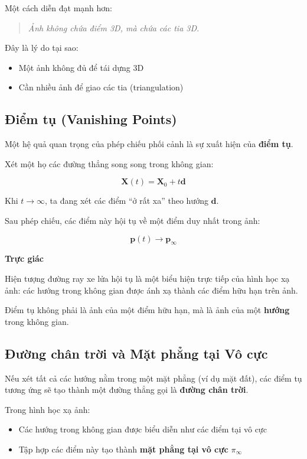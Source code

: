 Một cách diễn đạt mạnh hơn:

\begin{quote}
	\textit{Ảnh không chứa điểm 3D, mà chứa các tia 3D.}
\end{quote}

Đây là lý do tại sao:
\begin{itemize}
	\item Một ảnh không đủ để tái dựng 3D
	\item Cần nhiều ảnh để giao các tia (triangulation)
\end{itemize}

\subsection{Điểm tụ (Vanishing Points)}
\label{subsec:vanishing_points}

Một hệ quả quan trọng của phép chiếu phối cảnh là sự xuất hiện của \textbf{điểm tụ}.

Xét một họ các đường thẳng song song trong không gian:

\[
\mathbf{X}(t) = \mathbf{X}_0 + t \mathbf{d}
\]

Khi $t \rightarrow \infty$, ta đang xét các điểm “ở rất xa” theo hướng $\mathbf{d}$.

Sau phép chiếu, các điểm này hội tụ về một điểm duy nhất trong ảnh:

\[
\mathbf{p}(t) \rightarrow \mathbf{p}_{\infty}
\]

\begin{mdframed}[style=infobox]
	\textbf{Trực giác}
	
	Hiện tượng đường ray xe lửa hội tụ là một biểu hiện trực tiếp của hình học xạ ảnh: các hướng trong không gian được ánh xạ thành các điểm hữu hạn trên ảnh.
\end{mdframed}

Điểm tụ không phải là ảnh của một điểm hữu hạn, mà là ảnh của một \textbf{hướng} trong không gian.

\subsection{Đường chân trời và Mặt phẳng tại Vô cực}
\label{subsec:horizon_line}

Nếu xét tất cả các hướng nằm trong một mặt phẳng (ví dụ mặt đất), các điểm tụ tương ứng sẽ tạo thành một đường thẳng gọi là \textbf{đường chân trời}.

Trong hình học xạ ảnh:
\begin{itemize}
	\item Các hướng trong không gian được biểu diễn như các điểm tại vô cực
	\item Tập hợp các điểm này tạo thành \textbf{mặt phẳng tại vô cực} $\pi_{\infty}$
\end{itemize}

